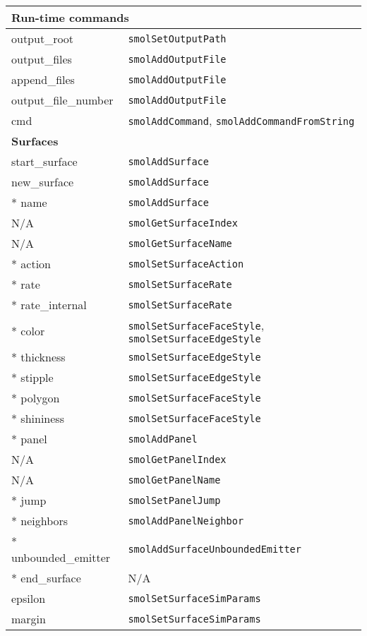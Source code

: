\documentclass {book}
\begin{document}
\begin{longtable}[c]{ll}
\hline
\multicolumn{2}{l}{\hspace{0.3in}\textbf{Run-time commands}}\\
\hline
output\_root & \texttt{smolSetOutputPath}\\
output\_files & \texttt{smolAddOutputFile}\\
append\_files & \texttt{smolAddOutputFile}\\
output\_file\_number & \texttt{smolAddOutputFile}\\
cmd & \texttt{smolAddCommand}, \texttt{smolAddCommandFromString}\\
\hline
\multicolumn{2}{l}{\hspace{0.3in}\textbf{Surfaces}}\\
\hline
start\_surface & \texttt{smolAddSurface}\\
new\_surface & \texttt{smolAddSurface}\\
{*} name & \texttt{smolAddSurface}\\
N/A & \texttt{smolGetSurfaceIndex}\\
N/A & \texttt{smolGetSurfaceName}\\
{*} action & \texttt{smolSetSurfaceAction}\\
{*} rate & \texttt{smolSetSurfaceRate}\\
{*} rate\_internal & \texttt{smolSetSurfaceRate}\\
{*} color & \texttt{smolSetSurfaceFaceStyle}, \texttt{smolSetSurfaceEdgeStyle}\\
{*} thickness & \texttt{smolSetSurfaceEdgeStyle}\\
{*} stipple & \texttt{smolSetSurfaceEdgeStyle}\\
{*} polygon & \texttt{smolSetSurfaceFaceStyle}\\
{*} shininess & \texttt{smolSetSurfaceFaceStyle}\\
{*} panel & \texttt{smolAddPanel}\\
N/A & \texttt{smolGetPanelIndex}\\
N/A & \texttt{smolGetPanelName}\\
{*} jump & \texttt{smolSetPanelJump}\\
{*} neighbors & \texttt{smolAddPanelNeighbor}\\
{*} unbounded\_emitter & \texttt{smolAddSurfaceUnboundedEmitter}\\
{*} end\_surface & N/A\\
epsilon & \texttt{smolSetSurfaceSimParams}\\
margin & \texttt{smolSetSurfaceSimParams}\\

\end{longtable}
\end{document}
